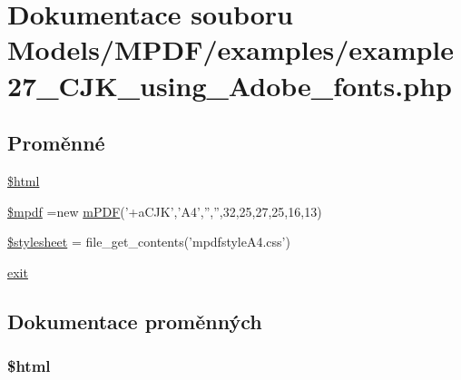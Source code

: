 \hypertarget{example27___c_j_k__using___adobe__fonts_8php}{\section{Dokumentace souboru Models/\-M\-P\-D\-F/examples/example27\-\_\-\-C\-J\-K\-\_\-using\-\_\-\-Adobe\-\_\-fonts.php}
\label{example27___c_j_k__using___adobe__fonts_8php}
}
\subsection*{Proměnné}
\begin{DoxyCompactItemize}
\item 
\hyperlink{example27___c_j_k__using___adobe__fonts_8php_a6f96e7fc92441776c9d1cd3386663b40}{\$html}
\item 
\hyperlink{example27___c_j_k__using___adobe__fonts_8php_ad028f81910d6cbab9b184d2214b3a8f8}{\$mpdf} =new \hyperlink{classm_p_d_f}{m\-P\-D\-F}('+a\-C\-J\-K','A4','','',32,25,27,25,16,13)
\item 
\hyperlink{example27___c_j_k__using___adobe__fonts_8php_a19e5cf73e817c55a49205e6ec78c88a8}{\$stylesheet} = file\-\_\-get\-\_\-contents('mpdfstyle\-A4.\-css')
\item 
\hyperlink{example27___c_j_k__using___adobe__fonts_8php_a6733eb5f605d09eaede9845835d71c4e}{exit}
\end{DoxyCompactItemize}


\subsection{Dokumentace proměnných}
\hypertarget{example27___c_j_k__using___adobe__fonts_8php_a6f96e7fc92441776c9d1cd3386663b40}{
\subsubsection[{\$html}]{\setlength{\rightskip}{0pt plus 5cm}\$html}}\label{example27___c_j_k__using___adobe__fonts_8php_a6f96e7fc92441776c9d1cd3386663b40}


